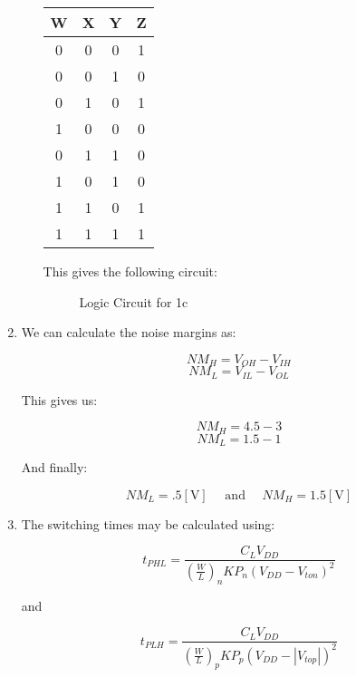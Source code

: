\begin{enumerate}
\begin{enumerate}
        \begin{center}
          \begin{tabular}[H]{|c|c|c|c|}
            \hline
            W & X & Y & Z\\
            \hline
            0 & 0 & 0 & 1\\
            \hline
            0 & 0 & 1 & 0\\
            \hline
            0 & 1 & 0 & 1\\
            \hline
            1 & 0 & 0 & 0\\
            \hline
            0 & 1 & 1 & 0\\
            \hline
            1 & 0 & 1 & 0\\
            \hline
            1 & 1 & 0 & 1\\
            \hline
            1 & 1 & 1 & 1\\
            \hline
          \end{tabular}
        \end{center}

        This gives the following circuit:

        \begin{figure}[H]
          \centering
          
          \caption{Logic Circuit for 1c}
          \label{fig:3}
        \end{figure}

    \end{enumerate}

  \item We can calculate the noise margins as:

    $$NM_H=V_{OH}-V_{IH}$$
    $$NM_L=V_{IL}-V_{OL}$$

    This gives us:

    $$NM_H=4.5-3$$
    $$NM_L=1.5-1$$

    And finally:

    $$\boxed{NM_L=.5[\si{\volt}]\quad\text{ and }\quad NM_H=1.5[\si{\volt}]}$$

  \item The switching times may be calculated using:

    $$t_{PHL}=\frac{C_LV_{DD}}{\left( \frac{W}{L} \right)_nKP_n(V_{DD}-V_{ton})^2}$$

    \begin{center}
      and
    \end{center}

    $$t_{PLH}=\frac{C_LV_{DD}}{\left( \frac{W}{L} \right)_pKP_p(V_{DD}-|V_{top}|)^2}$$


\end{enumerate}
